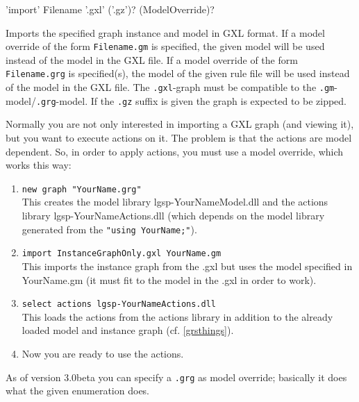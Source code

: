 \begin{rail}
  'import' Filename '.gxl' ('.gz')? (ModelOverride)?
\end{rail}
Imports the specified graph instance and model in GXL format.
If a model override of the form \texttt{Filename.gm} is specified, the given model will be used instead of the model in the GXL file.
If a model override of the form \texttt{Filename.grg} is specified(s), the model of the given rule file will be used instead of the model in the GXL file.
The \texttt{.gxl}-graph must be compatible to the \texttt{.gm}-model/\texttt{.grg}-model.
If the \texttt{.gz} suffix is given the graph is expected to be zipped.

\begin{note}\label{shellgxlimport}
Normally you are not only interested in importing a GXL graph (and viewing it), but you want to execute actions on it.
The problem is that the actions are model dependent.
So, in order to apply actions, you must use a model override, which works this way:
\begin{enumerate}
\item \texttt{new graph "YourName.grg"}\\
This creates the model library lgsp-YourNameModel.dll
and the actions library lgsp-YourNameActions.dll
(which depends on the model library generated from the \texttt{"using YourName;"}).
\item \texttt{import InstanceGraphOnly.gxl YourName.gm}\\
This imports the instance graph from the .gxl but uses the model specified
in YourName.gm (it must fit to the model in the .gxl in order to work).
\item \texttt{select actions lgsp-YourNameActions.dll}\\
This loads the actions from the actions library in addition to the already
loaded model and instance graph (cf. \ref{grsthings}).
\item Now you are ready to use the actions.
\end{enumerate}
As of version 3.0beta you can specify a \texttt{.grg} as model override;
basically it does what the given enumeration does.
\end{note}


